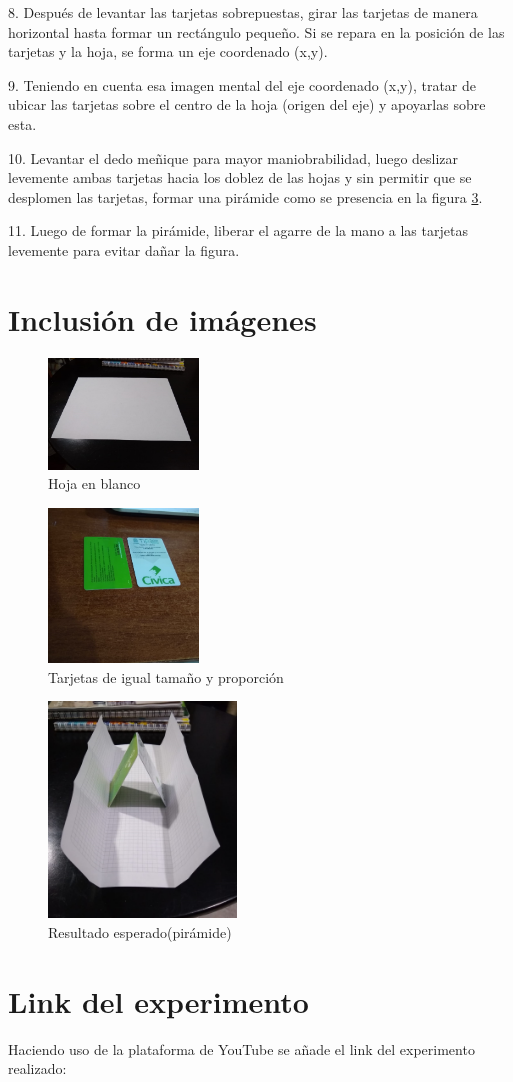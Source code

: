 \documentclass{article}
\begin{document}
8. Después de levantar las tarjetas sobrepuestas, girar las tarjetas de manera horizontal hasta formar un rectángulo pequeño. Si se repara en la posición de las tarjetas y la hoja, se forma un eje coordenado (x,y).

9. Teniendo en cuenta esa imagen mental del eje coordenado (x,y), tratar de ubicar las tarjetas sobre el centro de la hoja (origen del eje) y apoyarlas sobre esta.

10. Levantar el dedo meñique para mayor maniobrabilidad, luego deslizar levemente ambas tarjetas hacia los doblez de las hojas y sin permitir que se desplomen las tarjetas, formar una pirámide como se presencia en la figura \ref{fig:Piramide}.

11. Luego de formar la pirámide, liberar el agarre de la mano a las tarjetas levemente para evitar dañar la figura.

\section{Inclusión de imágenes} \label{imagenes}
\begin{figure}[h]
\includegraphics[width=4cm]{Hoja.jpeg}
\centering
\caption{Hoja en blanco}
\label{fig:Hoja}
\end{figure}
\begin{figure}[h]
\includegraphics[width=4cm]{Tarjetas.jpeg}
\centering
\caption{Tarjetas de igual tamaño y proporción}
\label{fig:Tarjetas}
\end{figure}
\begin{figure}[h]
\includegraphics[width=5cm]{Piramide.jpeg}
\centering
\caption{Resultado esperado(pirámide)}
\label{fig:Piramide}
\end{figure}

\section{Link del experimento}
Haciendo uso de la plataforma de YouTube se añade el link del experimento realizado:
\end{document}
